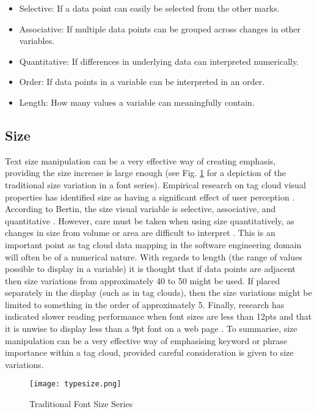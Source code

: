 \begin{itemize}
	\item Selective: If a data point can easily be selected from the other marks.
	\item Associative: If multiple data points can be grouped across changes in other variables.
 	\item Quantitative: If differences in underlying data can interpreted numerically.
 	\item Order: If data points in a variable can be interpreted in an order.
	\item Length: How many values a variable can meaningfully contain.
\end{itemize}

\subsection{Size} 

Text size manipulation can be a very effective way of creating emphasis, providing the size increase is large enough (see Fig. \ref{fig:fontseries} for a depiction of the traditional size variation in a font series). Empirical research on tag cloud visual properties has identified size as having a significant effect of user perception \citep[such as][]{lohmann09, bateman08, halvey07}. According to Bertin, the size visual variable is selective, associative, and quantitative \citep{bertin83}. However, care must be taken when using size quantitatively, as changes in size from volume or area are difficult to interpret \citep{carpendale03}. This is an important point as tag cloud data mapping in the software engineering domain will often be of a numerical nature. With regards to length (the range of values possible to display in a variable) it is thought that if data points are adjacent then size variations from approximately 40 to 50 might be used. If placed separately in the display (such as in tag clouds), then the size variations might be limited to something in the order of approximately 5. Finally, research has indicated slower reading performance when font sizes are less than 12pts and that it is unwise to display less than a 9pt font on a web page \citep[pg 107, chap 11:8][]{usability06}. To summarise, size manipulation can be a very effective way of emphasising keyword or phrase importance within a tag cloud, provided careful consideration is given to size variations. 

\begin{figure}[h!]
  \centering
  \texttt{[image: typesize.png]}
  \caption{Traditional Font Size Series}
  \label{fig:fontseries}
\end{figure}

